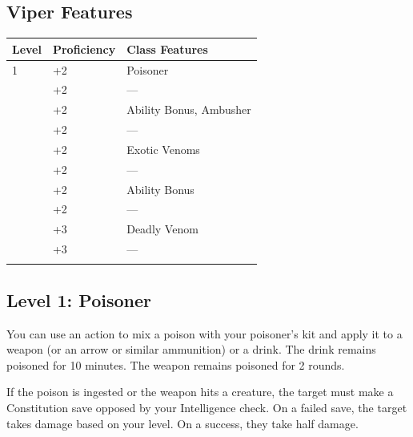 \documentclass[12pt,letterpaper,twocolumn,openany,nodeprecatedcode,bg=none]{dndbook}
\let\oldsubsection\subsection
\renewcommand{\subsection}[1]{%
  \needspace{5\baselineskip}%
  \oldsubsection{#1}%
}
\begin{document}
\subsection{Viper Features}\label{viper-features}


{\def\LTcaptype{none} %
\begin{table}[!htbp]
\centering
\begin{tabular}{@{}
  >{\raggedright\arraybackslash}p{}
  >{\raggedright\arraybackslash}p{}
  >{\raggedright\arraybackslash}p{}@{}}
\toprule\noalign{}
\begin{minipage}[b]{\linewidth}\raggedright
Level
\end{minipage} & \begin{minipage}[b]{\linewidth}\raggedright
Proficiency
\end{minipage} & \begin{minipage}[b]{\linewidth}\raggedright
Class Features
\end{minipage} \\
\midrule\noalign{}
1 & +2 & Poisoner \\
2 & +2 & --- \\
3 & +2 & Ability Bonus, Ambusher \\
4 & +2 & --- \\
5 & +2 & Exotic Venoms \\
6 & +2 & --- \\
7 & +2 & Ability Bonus \\
8 & +2 & --- \\
9 & +3 & Deadly Venom \\
10 & +3 & --- \\
\bottomrule\noalign{}
\end{tabular}
\end{table}
}

\subsection{Level 1: Poisoner}\label{level-1-poisoner}

You can use an action to mix a poison with your poisoner's kit and apply
it to a weapon (or an arrow or similar ammunition) or a drink. The drink
remains poisoned for 10 minutes. The weapon remains poisoned for 2
rounds.

If the poison is ingested or the weapon hits a creature, the target must
make a Constitution save opposed by your Intelligence check. On a failed
save, the target takes damage based on your level. On a success, they
take half damage.
\end{document}
